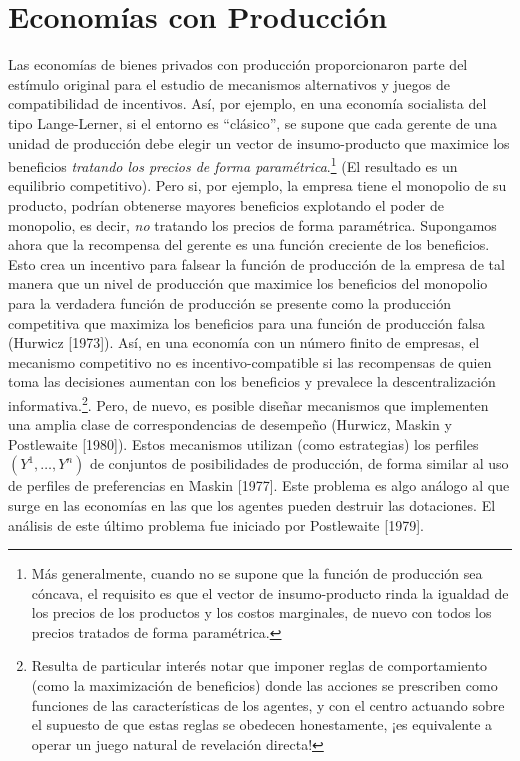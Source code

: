 \documentclass[12pt, letterpaper]{article}
\begin{document}
\section*{Economías con Producción}
Las economías de bienes privados con producción proporcionaron parte del estímulo original para el estudio de mecanismos alternativos y juegos de compatibilidad de incentivos. Así, por ejemplo, en una economía socialista del tipo Lange-Lerner, si el entorno es ``clásico'', se supone que cada gerente de una unidad de producción debe elegir un vector de insumo-producto que maximice los beneficios \textit{tratando los precios de forma paramétrica}.\footnote{Más generalmente, cuando no se supone que la función de producción sea cóncava, el requisito es que el vector de insumo-producto rinda la igualdad de los precios de los productos y los costos marginales, de nuevo con todos los precios tratados de forma paramétrica.} (El resultado es un equilibrio competitivo). Pero si, por ejemplo, la empresa tiene el monopolio de su producto, podrían obtenerse mayores beneficios explotando el poder de monopolio, es decir, \textit{no} tratando los precios de forma paramétrica. Supongamos ahora que la recompensa del gerente es una función creciente de los beneficios. Esto crea un incentivo para falsear la función de producción de la empresa de tal manera que un nivel de producción que maximice los beneficios del monopolio para la verdadera función de producción se presente como la producción competitiva que maximiza los beneficios para una función de producción falsa (Hurwicz [1973]). Así, en una economía con un número finito de empresas, el mecanismo competitivo no es incentivo-compatible si las recompensas de quien toma las decisiones aumentan con los beneficios y prevalece la descentralización informativa.\footnote{Resulta de particular interés notar que imponer reglas de comportamiento (como la maximización de beneficios) donde las acciones se prescriben como funciones de las características de los agentes, y con el centro actuando sobre el supuesto de que estas reglas se obedecen honestamente, ¡es equivalente a operar un juego natural de revelación directa!}. Pero, de nuevo, es posible diseñar mecanismos que implementen una amplia clase de correspondencias de desempeño (Hurwicz, Maskin y Postlewaite [1980]). Estos mecanismos utilizan (como estrategias) los perfiles $(Y^{1}, \dots, Y^{n})$ de conjuntos de posibilidades de producción, de forma similar al uso de perfiles de preferencias en Maskin [1977]. Este problema es algo análogo al que surge en las economías en las que los agentes pueden destruir las dotaciones. El análisis de este último problema fue iniciado por Postlewaite [1979]. \\
\end{document}
